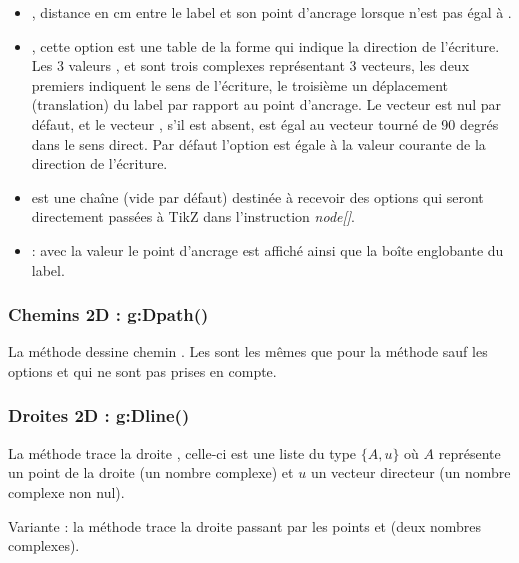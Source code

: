 \begin{itemize}
\begin{itemize}
            \item {}, distance en cm entre le label et son point d'ancrage lorsque  n'est pas égal à .
            
            \item {}, cette option est une table de la forme  qui indique la direction de l'écriture. Les 3 valeurs ,  et  sont trois complexes représentant 3 vecteurs, les deux premiers indiquent le sens de l'écriture, le troisième un déplacement (translation) du label par rapport au point d'ancrage. Le vecteur  est nul par défaut, et le vecteur , s'il est absent, est égal au vecteur  tourné de 90 degrés dans le sens direct.
            Par défaut l'option  est égale à la valeur courante de la direction de l'écriture.
            
            \item {} est une chaîne (vide par défaut) destinée à recevoir des options qui seront directement passées à TikZ dans l'instruction \emph{node[]}.
            
            \item {} : avec la valeur \true le point d'ancrage est affiché ainsi que la boîte englobante du label.
        \end{itemize}
\end{itemize}

\subsubsection{Chemins 2D : g:Dpath()}

La méthode  dessine chemin . Les  sont les mêmes que pour la méthode  sauf les options  et  qui ne sont pas prises en compte.

\subsubsection{Droites 2D : g:Dline()}

La méthode  trace la droite , celle-ci est une liste du type $\{A,u\}$ où $A$ représente un point de la droite (un nombre complexe) et $u$ un vecteur directeur (un nombre complexe non nul). 

Variante : la méthode  trace la droite passant par les points  et  (deux nombres complexes). 

